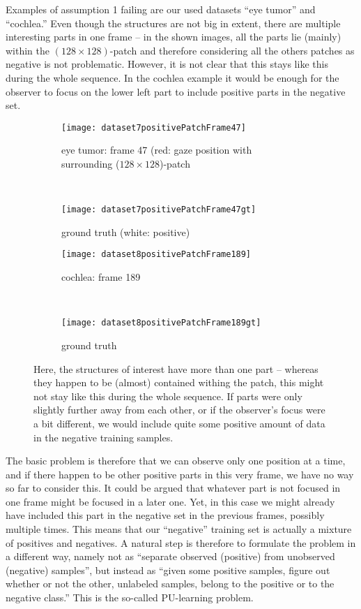 Examples of assumption 1 failing are our used datasets ``eye tumor'' and ``cochlea.'' Even though the structures are not big in extent, there are multiple interesting parts in one frame -- in the shown images, all the parts lie (mainly) within the $(128\times128)$-patch and therefore considering all the others patches as negative is not problematic. 
However, it is not clear that this stays like this during the whole sequence. 
In the cochlea example it would be enough for the observer to focus on the lower left part to include positive parts in the negative set. 

\begin{figure}[ht]
	\centering
	\begin{subfigure}[h]{0.48\textwidth}
		\texttt{[image: dataset7positivePatchFrame47]}
		\caption*{eye tumor: frame 47 (red: gaze position with surrounding ($128\times128$)-patch}
	\end{subfigure}
	~
	\begin{subfigure}[h]{0.48\textwidth}
	    \texttt{[image: dataset7positivePatchFrame47gt]}
	    \caption*{ground truth (white: positive) \newline}
	\end{subfigure}
	
	\vspace{3mm}
	\begin{subfigure}[h]{0.48\textwidth}
		\texttt{[image: dataset8positivePatchFrame189]}	
		\caption*{cochlea: frame 189}
	\end{subfigure}
	~
	\begin{subfigure}[h]{0.48\textwidth}
		\texttt{[image: dataset8positivePatchFrame189gt]}	
		\caption*{ground truth}
	\end{subfigure}
	\caption{Here, the structures of interest have more than one part -- whereas they happen to be (almost) contained withing the patch, this might not stay like this during the whole sequence. If parts were only slightly further away from each other, or if the observer's focus were a bit different, we would include quite some positive amount of data in the negative training samples.}
	\label{fig:nonValidAssumptionD78}
\end{figure}

The basic problem is therefore that we can observe only one position at a time, and if there happen to be other positive parts in this very frame, we have no way so far to consider this. 
It could be argued that whatever part is not focused in one frame might be focused in a later one. 
Yet, in this case we might already have included this part in the negative set in the previous frames, possibly multiple times. 
This means that our ``negative'' training set is actually a mixture of positives and negatives.
A natural step is therefore to formulate the problem in a different way, namely not as ``separate observed (positive) from unobserved (negative) samples'', but instead as ``given some positive samples, figure out whether or not the other, unlabeled samples, belong to the positive or to the negative class.'' This is the so-called PU-learning problem.

